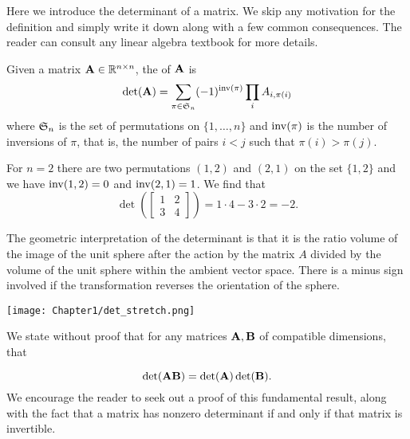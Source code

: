 
Here we introduce the determinant of a matrix. We skip any motivation for the definition and simply write it down along with a few common consequences. The reader can consult any linear algebra textbook for more details.

\begin{definition}
Given a matrix $\MA \in \mathbb R^{n \times n}$, the  of $\MA$ is
$$\det(\MA) = \sum_{\pi \in \FS_n} (-1)^{\inv(\pi)} \prod_i A_{i, \pi(i)}$$
where $\FS_n$ is the set of permutations on $\{1,\dots,n\}$ and $\inv(\pi)$ is the number of inversions of $\pi$, that is, the number of pairs $i<j$ such that $\pi(i)>\pi(j)$.
\end{definition}

\begin{example}
For $n=2$ there are two permutations $(1,2)$ and $(2,1)$ on the set $\{1,2\}$ and we have $\inv(1,2) = 0$ and $\inv(2,1) = 1$. We find that
$$\det \left (\begin{bmatrix} 1 & 2 \\
3 & 4 \end{bmatrix} \right )  = 1\cdot4 - 3\cdot2 = -2.$$
\end{example}


\begin{note}
The geometric interpretation of the determinant is that it is the ratio volume of the image of the unit sphere after the action by the matrix $A$ divided by the volume of the unit sphere within the ambient vector space. There is a minus sign involved if the transformation reverses the orientation of the sphere.
\end{note}

 \begin{center}
  \texttt{[image: Chapter1/det\_stretch.png]}
\end{center}

We state without proof that for any matrices $\MA,\MB$ of compatible dimensions, that

\begin{equation}
    \det(\MA\MB) = \det(\MA) \det(\MB).
\end{equation} 
We encourage the reader to seek out a proof of this fundamental result, along with the fact that a matrix has nonzero determinant if and only if that matrix is invertible.

